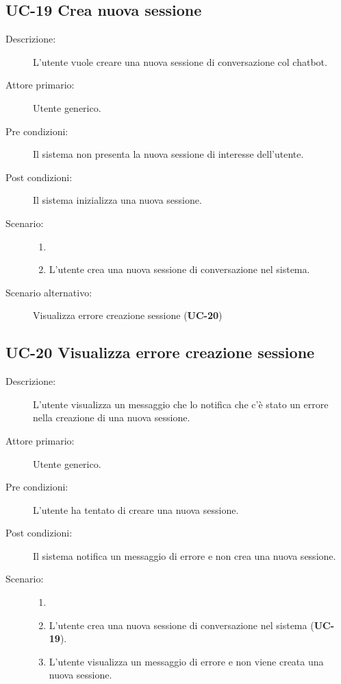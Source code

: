 \subsection{UC-19 Crea nuova sessione}
\begin{description}
    \item[Descrizione:] L'utente vuole creare una nuova sessione di conversazione col chatbot.
    \item[Attore primario:] Utente generico.
    \item[Pre condizioni:] Il sistema non presenta la nuova sessione di interesse dell'utente.
    \item[Post condizioni:] Il sistema inizializza una nuova sessione.
    \item[Scenario:] 
    \begin{enumerate}
        \item[]
        \item L'utente crea una nuova sessione di conversazione nel sistema.
    \end{enumerate}
    \item[Scenario alternativo:] Visualizza errore creazione sessione (\textbf{UC-20})
\end{description}

\subsection{UC-20 Visualizza errore creazione sessione}
\begin{description}
    \item[Descrizione:] L'utente visualizza un messaggio che lo notifica che c'è stato un errore nella creazione di una nuova sessione.
    \item[Attore primario:] Utente generico.
    \item[Pre condizioni:] L'utente ha tentato di creare una nuova sessione.
    \item[Post condizioni:] Il sistema notifica un messaggio di errore e non crea una nuova sessione.
    \item[Scenario:] 
    \begin{enumerate}
        \item[]
        \item L'utente crea una nuova sessione di conversazione nel sistema (\textbf{UC-19}).
        \item L'utente visualizza un messaggio di errore e non viene creata una nuova sessione.
    \end{enumerate}
\end{description}

